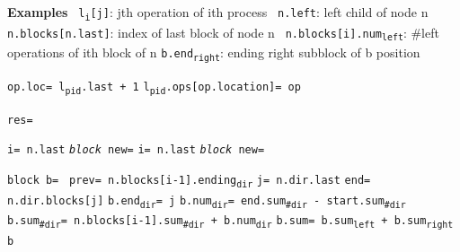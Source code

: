 \documentclass[10pt]{article}
\newcommand\keywordfont{\sffamily\bfseries}
\theoremstyle{definition}
\begin{document}
\begin{algorithm}
\begin{algorithmic}[1]
\begin{multicols}{2}
\Statex \textbf{Examples}
\Statex \hspace{0pt} \texttt{ l\textsubscript{i}[j]}\textsf{: jth operation of ith process}
\Statex \hspace{0pt} \texttt{ n.left}\textsf{: left child of node n}
\Statex \hspace{0pt} \texttt{ n.blocks[n.last]}\textsf{: index of last block of node n}
\Statex \hspace{0pt} \texttt{ n.blocks[i].num\textsubscript{left}}\textsf{: \#left operations of ith block of n}
\Statex \hspace{4pt} \texttt{b.end\textsubscript{right}}\textsf{: ending right subblock of b position}

\Statex

\State \texttt{op.loc= l\textsubscript{pid}.last + 1}
\State \texttt{l\textsubscript{pid}.ops[op.location]= op}
\State {}
\State \Return {}

\columnbreak

\State \texttt{res=}
\State {}

\Statex



\If{\texttt{n {\keywordfont is} root}} \Return
\Else
\State \texttt{i= n.last}
\State \texttt{\textsl{block} new=}
\State \texttt{}
\Else
\State \texttt{i= n.last}
\State \texttt{\textsl{block} new=}
\State \texttt{}
\EndIf
\EndIf
\EndIf
\State {}

\Statex

\Statex{}
\State \texttt{block b= }
\ForEach{\texttt{dir} {\keywordfont{in}} \texttt{\{left, right\}}}
\State \texttt{prev= n.blocks[i-1].ending\textsubscript{dir}}
\State \texttt{j= n.dir.last}
\State \texttt{end= n.dir.blocks[j]}
\State \texttt{b.end\textsubscript{dir}= j}
\State \texttt{b.num\textsubscript{dir}= end.sum\textsubscript{\#dir} - start.sum\textsubscript{\#dir}}
\State \texttt{b.sum\textsubscript{\#dir}= n.blocks[i-1].sum\textsubscript{\#dir} + b.num\textsubscript{dir}}
\EndFor
\State \texttt{b.sum= b.sum\textsubscript{left} + b.sum\textsubscript{right}}
\State \Return \texttt{b}





\end{multicols}
\end{algorithmic}
\end{algorithm}
\end{document}
